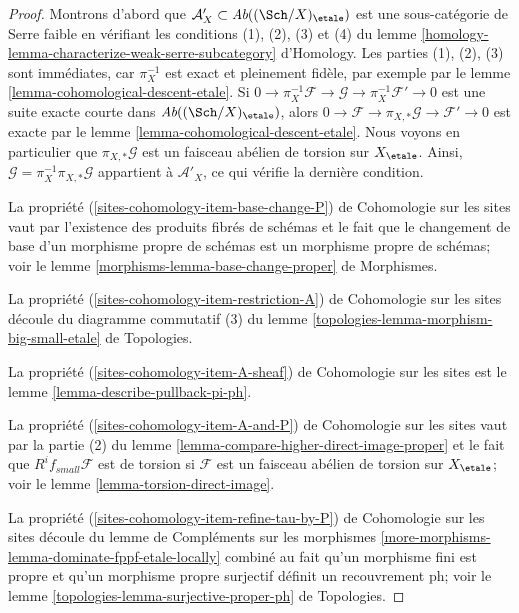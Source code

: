 \begin{proof}
Montrons d'abord que $\mathcal{A}'_X \subset \textit{Ab}((\Sch/X)_\etale)$
est une sous-catégorie de Serre faible en vérifiant les conditions (1), (2), (3) et (4)
du lemme \ref{homology-lemma-characterize-weak-serre-subcategory} d'Homology.
Les parties (1), (2), (3) sont immédiates, car $\pi_X^{-1}$ est exact et
pleinement fidèle, par exemple par le lemme \ref{lemma-cohomological-descent-etale}. Si
$0 \to \pi_X^{-1}\mathcal{F} \to \mathcal{G} \to \pi_X^{-1}\mathcal{F}' \to 0$
est une suite exacte courte dans $\textit{Ab}((\Sch/X)_\etale)$,
alors $0 \to \mathcal{F} \to \pi_{X, *}\mathcal{G} \to \mathcal{F}' \to 0$
est exacte par le lemme \ref{lemma-cohomological-descent-etale}.
Nous voyons en particulier que $\pi_{X, *}\mathcal{G}$ est un faisceau
abélien de torsion sur $X_\etale$.
Ainsi, $\mathcal{G} = \pi_X^{-1}\pi_{X, *}\mathcal{G}$ appartient à
$\mathcal{A}'_X$, ce qui vérifie la dernière condition.

\medskip\noindent
La propriété (\ref{sites-cohomology-item-base-change-P}) de Cohomologie sur les sites vaut
par l'existence des produits fibrés de schémas
et le fait que le changement de base d'un morphisme propre de
schémas est un morphisme propre de schémas; voir le
lemme \ref{morphisms-lemma-base-change-proper} de Morphismes.

\medskip\noindent
La propriété (\ref{sites-cohomology-item-restriction-A}) de Cohomologie sur les sites
découle du diagramme commutatif (3) du
lemme \ref{topologies-lemma-morphism-big-small-etale} de Topologies.

\medskip\noindent
La propriété (\ref{sites-cohomology-item-A-sheaf}) de Cohomologie sur les sites est le
lemme \ref{lemma-describe-pullback-pi-ph}.

\medskip\noindent
La propriété (\ref{sites-cohomology-item-A-and-P}) de Cohomologie sur les sites vaut par la
partie (2) du lemme \ref{lemma-compare-higher-direct-image-proper}
et le fait que $R^if_{small}\mathcal{F}$
est de torsion si $\mathcal{F}$ est un faisceau
abélien de torsion sur $X_\etale$; voir le lemme \ref{lemma-torsion-direct-image}.

\medskip\noindent
La propriété (\ref{sites-cohomology-item-refine-tau-by-P}) de Cohomologie sur les sites
découle du lemme de Compléments sur les morphismes
\ref{more-morphisms-lemma-dominate-fppf-etale-locally}
combiné au fait qu'un morphisme fini est propre
et qu'un morphisme propre surjectif définit un recouvrement ph; voir le
lemme \ref{topologies-lemma-surjective-proper-ph} de Topologies.
\end{proof}

